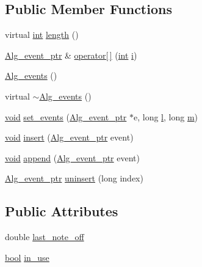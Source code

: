 \subsection*{Public Member Functions}
\begin{DoxyCompactItemize}
\item 
virtual \hyperlink{xmltok_8h_a5a0d4a5641ce434f1d23533f2b2e6653}{int} \hyperlink{class_alg__events_a153f53aff30edb4b3cb1b02a8fa54c8f}{length} ()
\item 
\hyperlink{allegro_8h_aeb8db009b4ffadef2e7ca0e4936f0307}{Alg\+\_\+event\+\_\+ptr} \& \hyperlink{class_alg__events_abdfbc3dd920dcd9c56e10b83a6fa49d8}{operator\mbox{[}$\,$\mbox{]}} (\hyperlink{xmltok_8h_a5a0d4a5641ce434f1d23533f2b2e6653}{int} \hyperlink{checksum_8c_ab80e330a3bc9e38c1297fe17381e92b4}{i})
\item 
\hyperlink{class_alg__events_a9d2eab798f07044d8a14a23f8e210b7e}{Alg\+\_\+events} ()
\item 
virtual \hyperlink{class_alg__events_a66eb42bc6a46bde342bea45de974198a}{$\sim$\+Alg\+\_\+events} ()
\item 
\hyperlink{sound_8c_ae35f5844602719cf66324f4de2a658b3}{void} \hyperlink{class_alg__events_a2546637d6b3d3d8bdf510fe559f02825}{set\+\_\+events} (\hyperlink{allegro_8h_aeb8db009b4ffadef2e7ca0e4936f0307}{Alg\+\_\+event\+\_\+ptr} $\ast$e, long \hyperlink{layer3_8c_a741dbb4d8e78c3cb69915db7282fcec0}{l}, long \hyperlink{layer3_8c_a4b8bfe70f28d6faddcb10d6ecf8c1989}{m})
\item 
\hyperlink{sound_8c_ae35f5844602719cf66324f4de2a658b3}{void} \hyperlink{class_alg__events_a645263c6b94cf2efeb81df2b3d31bacc}{insert} (\hyperlink{allegro_8h_aeb8db009b4ffadef2e7ca0e4936f0307}{Alg\+\_\+event\+\_\+ptr} event)
\item 
\hyperlink{sound_8c_ae35f5844602719cf66324f4de2a658b3}{void} \hyperlink{class_alg__events_a0341d80013a4475b42c5b4c920a5b576}{append} (\hyperlink{allegro_8h_aeb8db009b4ffadef2e7ca0e4936f0307}{Alg\+\_\+event\+\_\+ptr} event)
\item 
\hyperlink{allegro_8h_aeb8db009b4ffadef2e7ca0e4936f0307}{Alg\+\_\+event\+\_\+ptr} \hyperlink{class_alg__events_a73d1e72f5a86bad27f3128a310e9f38d}{uninsert} (long index)
\end{DoxyCompactItemize}
\subsection*{Public Attributes}
\begin{DoxyCompactItemize}
\item 
double \hyperlink{class_alg__events_ab0a98f7d3e8bc899d98936fed6e4aeed}{last\+\_\+note\+\_\+off}
\item 
\hyperlink{mac_2config_2i386_2lib-src_2libsoxr_2soxr-config_8h_abb452686968e48b67397da5f97445f5b}{bool} \hyperlink{class_alg__events_a26ad846e460a39e3c69b0dbee121a546}{in\+\_\+use}
\end{DoxyCompactItemize}

